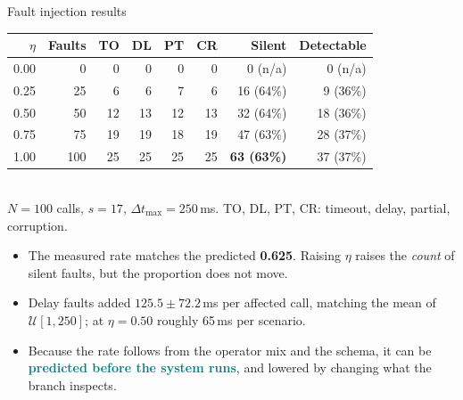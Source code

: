 \documentclass[aspectratio=169,10pt]{beamer}
\newcommand{\hl}[1]{\textcolor{teal}{\textbf{#1}}}      %
\newcommand{\risk}[1]{\textcolor{rust}{\textbf{#1}}}    %
\newcommand{\cmt}[1]{{\color{stone}\small #1}}          %
\begin{document}
\begin{frame}{Fault injection results}
  \begin{table}
    \small
    \begin{tabular}{@{}rrrrrrrr@{}}
      \toprule
      $\eta$ & Faults & TO & DL & PT & CR & Silent & Detectable\\
      \midrule
      0.00 & 0   & 0  & 0  & 0  & 0  & 0 (n/a) & 0 (n/a)\\
      0.25 & 25  & 6  & 6  & 7  & 6  & 16 (64\%) & 9 (36\%)\\
      0.50 & 50  & 12 & 13 & 12 & 13 & 32 (64\%) & 18 (36\%)\\
      0.75 & 75  & 19 & 19 & 18 & 19 & 47 (63\%) & 28 (37\%)\\
      1.00 & 100 & 25 & 25 & 25 & 25 & \risk{63 (63\%)} & 37 (37\%)\\
      \bottomrule
    \end{tabular}
    \\[0.4em]
    \cmt{$N = 100$ calls, $s = 17$, $\Delta t_{\max} = 250$\,ms.
    TO, DL, PT, CR: timeout, delay, partial, corruption.}
  \end{table}
  \vfill
  \begin{itemize}
    \item The measured rate matches the predicted \risk{0.625}. Raising $\eta$ raises the
      \emph{count} of silent faults, but the proportion does not move.
    \item Delay faults added $125.5 \pm 72.2$\,ms per affected call, matching the mean of
      $\mathcal{U}[1,250]$; at $\eta = 0.50$ roughly 65\,ms per scenario.
    \item Because the rate follows from the operator mix and the schema, it can be
      \hl{predicted before the system runs}, and lowered by changing what the branch inspects.
  \end{itemize}
\end{frame}
\end{document}
